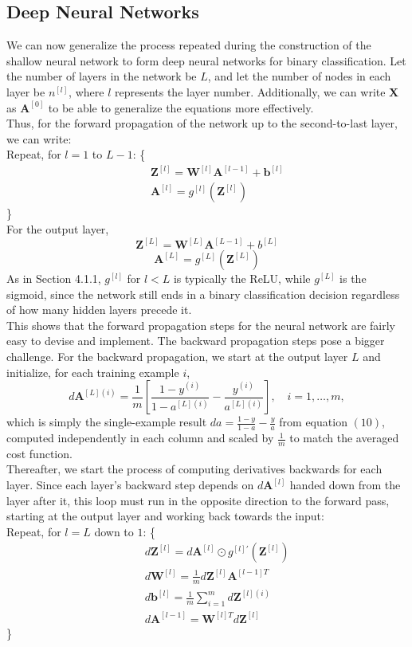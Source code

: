 \documentclass{article}
\begin{document}
\subsection{Deep Neural Networks}
We can now generalize the process repeated during the construction of the shallow neural network to form deep neural networks for binary classification. Let the number of layers in the network be $L$, and let the number of nodes in each layer be $n^{[l]}$, where $l$ represents the layer number. Additionally, we can write $\mathbf{X}$ as $\mathbf{A}^{[0]}$ to be able to generalize the equations more effectively.
\\
Thus, for the forward propagation of the network up to the second-to-last layer, we can write:
\\
Repeat, for $l=1$ to $L-1$: \{
\begin{align*}
    &\quad \mathbf{Z}^{[l]}=\mathbf{W}^{[l]} \mathbf{A}^{[l-1]} + \mathbf{b}^{[l]} \\
    &\quad \mathbf{A}^{[l]}=g^{[l]}(\mathbf{Z}^{[l]})
\end{align*}
\}
\\
For the output layer,
$$\mathbf{Z}^{[L]}=\mathbf{W}^{[L]} \mathbf{A}^{[L-1]} + b^{[L]}$$
$$\mathbf{A}^{[L]}=g^{[L]}(\mathbf{Z}^{[L]})$$
As in Section 4.1.1, $g^{[l]}$ for $l < L$ is typically the ReLU, while $g^{[L]}$ is the sigmoid, since the network still ends in a binary classification decision regardless of how many hidden layers precede it.
\\
This shows that the forward propagation steps for the neural network are fairly easy to devise and implement. The backward propagation steps pose a bigger challenge. For the backward propagation, we start at the output layer $L$ and initialize, for each training example $i$,
$$d\mathbf{A}^{[L](i)}=\frac{1}{m}\left[ \frac{1-y^{(i)}}{1-a^{[L](i)}} - \frac{y^{(i)}}{a^{[L](i)}} \right], \quad i = 1, \dots, m,$$
which is simply the single-example result $da = \frac{1-y}{1-a} - \frac{y}{a}$ from equation $(10)$, computed independently in each column and scaled by $\frac{1}{m}$ to match the averaged cost function.
\\
Thereafter, we start the process of computing derivatives backwards for each layer. Since each layer's backward step depends on $d\mathbf{A}^{[l]}$ handed down from the layer after it, this loop must run in the opposite direction to the forward pass, starting at the output layer and working back towards the input:
\\
Repeat, for $l=L$ down to $1$: \{
\begin{align*}
    &\quad d\mathbf{Z}^{[l]}=d\mathbf{A}^{[l]} \odot g^{[l]\prime}(\mathbf{Z}^{[l]}) \\
    &\quad d\mathbf{W}^{[l]} = \frac{1}{m} d\mathbf{Z}^{[l]}\mathbf{A}^{[l-1]T} \\
    &\quad d\mathbf{b}^{[l]}=\frac{1}{m}\sum_{i=1}^{m}d\mathbf{Z}^{[l](i)} \\
    &\quad d\mathbf{A}^{[l-1]}=\mathbf{W}^{[l]T} d\mathbf{Z}^{[l]}
\end{align*}
\}
\end{document}
